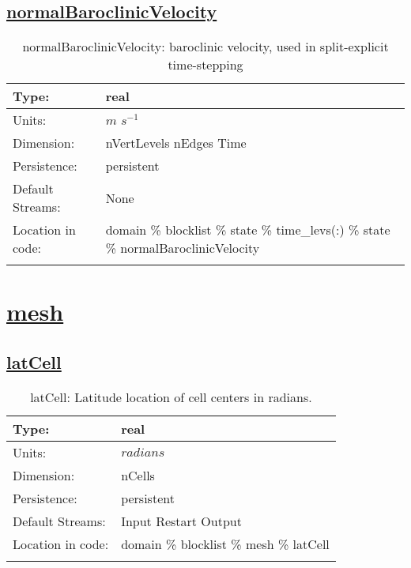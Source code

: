 \subsection[normalBaroclinicVelocity]{\hyperref[sec:var_tab_state]{normalBaroclinicVelocity}}
\label{subsec:var_sec_state_normalBaroclinicVelocity}
\begin{center}
\begin{longtable}{| p{2.0in} | p{4.0in} |}
        \hline 
        Type: & real \\
        \hline 
        Units: & $m$ $s^{-1}$ \\
        \hline 
        Dimension: & nVertLevels nEdges Time \\
        \hline 
        Persistence: & persistent \\
        \hline 
		 Default Streams: & None \\
        \hline 
		 Location in code: & domain \% blocklist \% state \% time\_levs(:) \% state \% normalBaroclinicVelocity \\
		 \hline 
    \caption{normalBaroclinicVelocity: baroclinic velocity, used in split-explicit time-stepping}
\end{longtable}
\end{center}
\section[mesh]{\hyperref[sec:var_tab_mesh]{mesh}}
\label{sec:var_sec_mesh}
\subsection[latCell]{\hyperref[sec:var_tab_mesh]{latCell}}
\label{subsec:var_sec_mesh_latCell}
\begin{center}
\begin{longtable}{| p{2.0in} | p{4.0in} |}
        \hline 
        Type: & real \\
        \hline 
        Units: & $radians$ \\
        \hline 
        Dimension: & nCells \\
        \hline 
        Persistence: & persistent \\
        \hline 
		 Default Streams: & Input Restart Output  \\
        \hline 
		 Location in code: & domain \% blocklist \% mesh \% latCell \\
		 \hline 
    \caption{latCell: Latitude location of cell centers in radians.}
\end{longtable}
\end{center}
